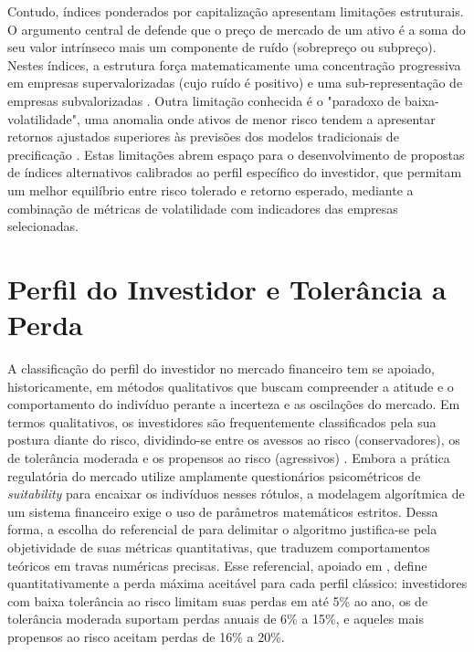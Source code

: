 Contudo, índices ponderados por capitalização apresentam limitações estruturais. O argumento central de  defende que o preço de mercado de um ativo é a soma do seu valor intrínseco mais um componente de ruído (sobrepreço ou subpreço). Nestes índices, a estrutura força matematicamente uma concentração progressiva em empresas supervalorizadas (cujo ruído é positivo) e uma sub-representação de empresas subvalorizadas \cite{siegel_future_2005}. Outra limitação conhecida é o "paradoxo de baixa-volatilidade", uma anomalia onde ativos de menor risco tendem a apresentar retornos ajustados superiores às previsões dos modelos tradicionais de precificação \cite{Baker2011Benchmarks}. Estas limitações abrem espaço para o desenvolvimento de propostas de índices alternativos calibrados ao perfil específico do investidor, que permitam um melhor equilíbrio entre risco tolerado e retorno esperado, mediante a combinação de métricas de volatilidade com indicadores das empresas selecionadas.

\section{Perfil do Investidor e Tolerância a Perda}
\label{perfil investidor}

A classificação do perfil do investidor no mercado financeiro tem se apoiado, historicamente, em métodos qualitativos que buscam compreender a atitude e o comportamento do indivíduo perante a incerteza e as oscilações do mercado. Em termos qualitativos, os investidores são frequentemente classificados pela sua postura diante do risco, dividindo-se entre os avessos ao risco (conservadores), os de tolerância moderada e os propensos ao risco (agressivos) \cite{assaf_neto_mercado_2022}. Embora a prática regulatória do mercado utilize amplamente questionários psicométricos de \textit{suitability} para encaixar os indivíduos nesses rótulos, a modelagem algorítmica de um sistema financeiro exige o uso de parâmetros matemáticos estritos. Dessa forma, a escolha do referencial de  para delimitar o algoritmo justifica-se pela objetividade de suas métricas quantitativas, que traduzem comportamentos teóricos em travas numéricas precisas. Esse referencial, apoiado em , define quantitativamente a perda máxima aceitável para cada perfil clássico: investidores com baixa tolerância ao risco limitam suas perdas em até 5\% ao ano, os de tolerância moderada suportam perdas anuais de 6\% a 15\%, e aqueles mais propensos ao risco aceitam perdas de 16\% a 20\%.

